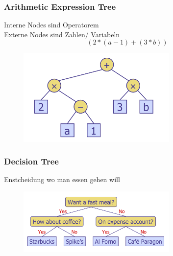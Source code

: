 \documentclass[a4paper,10pt]{report}
\begin{document}
\subsubsection{Arithmetic Expression Tree} 
Interne Nodes sind Operatorem\\
Externe Nodes sind Zahlen/ Variabeln
\begin{equation*}(2*(a-1)+(3*b))\end{equation*}
\begin{figure}[H]
	\begin{center}
  		\includegraphics[width=0.7\textwidth]{img/arithmeticexpression.png}
	\end{center}
\end{figure}
\subsubsection{Decision Tree}
Enstcheidung wo man essen gehen will
\begin{figure}[H]
	\begin{center}
  		\includegraphics[width=0.7\textwidth]{img/decisiontree.png}
	\end{center}
\end{figure}
\newpage
\end{document}
